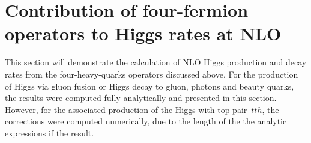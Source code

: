 %
\section{Contribution of four-fermion operators to Higgs rates at NLO \label{sec:HiggsCalc}}
This section will demonstrate the calculation of NLO Higgs production and decay rates from the four-heavy-quarks operators discussed above. For the production of Higgs via gluon fusion or Higgs decay to gluon, photons and beauty quarks, the results were computed fully analytically and presented in this section. However, for the associated production of the Higgs with top pair~$ t\bar{t} h$, the corrections were computed numerically, due to the length of the the analytic expressions if the result.

